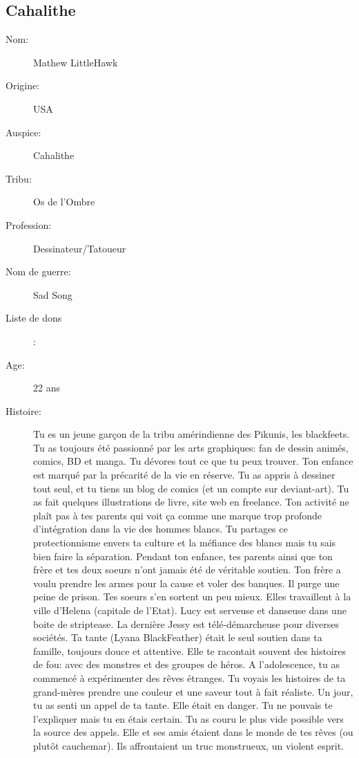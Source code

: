\documentclass[oneside,12pt]{book}
\begin{document}
\begin{flushleft}
\section{Cahalithe}
\begin{description}
\item[Nom:]{Mathew LittleHawk}
\item[Origine:]{USA}
\item[Auspice:]{Cahalithe}
\item[Tribu:]{Os de l'Ombre}
\item[Profession:]{Dessinateur/Tatoueur}
\item[Nom de guerre:]{Sad Song}
\item[Liste de dons]:
\item[Age:]{22 ans}
\item[Histoire:]{
Tu es un jeune garçon de la tribu amérindienne des Pikunis, les blackfeets. Tu as toujours été passionné par les arts graphiques: fan de dessin animés, comics, BD et manga. Tu dévores tout ce que tu peux trouver.
Ton enfance est marqué par la précarité de la vie en réserve. Tu as appris à dessiner tout seul, et tu tiens un blog de comics (et un compte sur deviant-art). Tu as fait quelques illustrations de livre, site web en
freelance. Ton activité ne plaît pas à tes parents qui voit ça comme une marque trop profonde d'intégration dans la vie des hommes blancs. Tu partages ce protectionnisme envers ta culture et la méfiance des blancs mais tu sais bien faire la séparation.
Pendant ton enfance, tes parents ainsi que ton frère et  tes deux soeurs n'ont jamais été de véritable soutien. Ton frère a voulu prendre les armes pour la cause et voler des banques. Il purge une peine de prison. Tes
soeurs s'en sortent un peu mieux. Elles travaillent à la ville d'Helena (capitale de l'Etat). Lucy est serveuse et danseuse dans une boite de striptease. La dernière Jessy est télé-démarcheuse pour diverses sociétés.
Ta tante (Lyana BlackFeather) était le seul soutien dans ta famille, toujours douce et attentive. Elle te racontait souvent des histoires de fou: avec des monstres et des groupes de héros. A l'adolescence, tu as commencé
à expérimenter des rêves étranges. Tu voyais les histoires de ta grand-mères prendre une couleur et une saveur tout à fait réaliste. Un jour, tu as senti un appel de ta tante. Elle était en danger. Tu ne pouvais te
l'expliquer mais tu en étais certain. Tu as couru le plus vide possible vers la source des appels. Elle et ses amis étaient dans le monde de tes rêves (ou plutôt cauchemar). 
Ils affrontaient un truc monstrueux, un violent esprit. \\
}
\end{description}
\end{flushleft}
\end{document}
